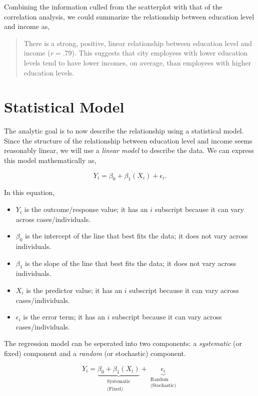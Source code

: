 \documentclass[]{book}
\providecommand{\tightlist}{%
  \setlength{\itemsep}{0pt}\setlength{\parskip}{0pt}}
\theoremstyle{definition}
\theoremstyle{definition}
\theoremstyle{definition}
\theoremstyle{remark}
\begin{document}
Combining the information culled from the scatterplot with that of the
correlation analysis, we could summarize the relationship between
education level and income as,

\begin{quote}
There is a strong, positive, linear relationship between education level
and income (\(r = .79\)). This suggests that city employees with lower
education levels tend to have lower incomes, on average, than employees
with higher education levels.
\end{quote}

\hypertarget{statistical-model}{%
\section{Statistical Model}\label{statistical-model}}

The analytic goal is to now describe the relationship using a
statistical model. Since the structure of the relationship between
education level and income seems reasonably linear, we will use a
\emph{linear model} to describe the data. We can express this model
mathematically as,

\[
Y_i = \beta_0 + \beta_1(X_i) + \epsilon_i.
\]

In this equation,

\begin{itemize}
\tightlist
\item
  \(Y_i\) is the outcome/response value; it has an \(i\) subscript
  because it can vary across cases/individuals.
\item
  \(\beta_0\) is the intercept of the line that best fits the data; it
  does not vary across individuals.
\item
  \(\beta_1\) is the slope of the line that best fits the data; it does
  not vary across individuals.
\item
  \(X_i\) is the predictor value; it has an \(i\) subscript because it
  can vary across cases/individuals.
\item
  \(\epsilon_i\) is the error term; it has an \(i\) subscript because it
  can vary across cases/individuals.
\end{itemize}

The regression model can be seperated into two components: a
\emph{systematic} (or fixed) component and a \emph{random} (or
stochastic) component.

\[
Y_i = \underbrace{\beta_0 + \beta_1(X_i)}_{\substack{\text{Systematic} \\ \text{(Fixed)}}} + \underbrace{\epsilon_i}_{\substack{\text{Random} \\ \text{(Stochastic)}}} 
\]
\end{document}
